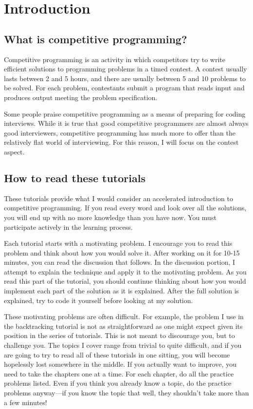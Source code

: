 \section{Introduction}

\subsection*{What is competitive programming?}

Competitive programming is an activity in which competitors try to write efficient solutions to programming problems in a timed contest. A contest usually lasts between 2 and 5 hours, and there are usually between 5 and 10 problems to be solved. For each problem, contestants submit a program that reads input and produces output meeting the problem specification.

Some people praise competitive programming as a means of preparing for coding interviews. While it is true that good competitive programmers are almost always good interviewers, competitive programming has much more to offer than the relatively flat world of interviewing. For this reason, I will focus on the contest aspect.

\subsection*{How to read these tutorials}

These tutorials provide what I would consider an accelerated introduction to competitive programming. If you read every word and look over all the solutions, you will end up with no more knowledge than you have now. You must participate actively in the learning process.

Each tutorial starts with a motivating problem. I encourage you to read this problem and think about how you would solve it. After working on it for 10-15 minutes, you can read the discussion that follows. In the discussion portion, I attempt to explain the technique and apply it to the motivating problem. As you read this part of the tutorial, you should continue thinking about how you would implement each part of the solution as it is explained. After the full solution is explained, try to code it yourself before looking at my solution.

These motivating problems are often difficult. For example, the problem I use in the backtracking tutorial is not as straightforward as one might expect given its position in the series of tutorials. This is not meant to discourage you, but to challenge you. The topics I cover range from trivial to quite difficult, and if you are going to try to read all of these tutorials in one sitting, you will become hopelessly lost somewhere in the middle. If you actually want to improve, you need to take the chapters one at a time. For each chapter, do all the practice problems listed. Even if you think you already know a topic, do the practice problems anyway---if you know the topic that well, they shouldn't take more than a few minutes!


